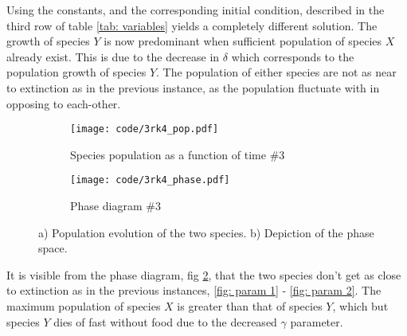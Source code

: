 \documentclass[a4paper]{article}
\newcommand{\newparagraph}{\vspace{.5cm}\noindent}
\begin{document}
\newparagraph
Using the constants, and the corresponding initial condition, described in the third row of table \ref{tab: variables} yields a completely different solution. The growth of species $Y$ is now predominant when sufficient population of species $X$ already exist. This is due to the decrease in $\delta$ which corresponds to the population growth of species $Y$. The population of either species are not as near to extinction as in the previous instance, as the population fluctuate with in opposing to each-other.
\begin{figure}[H]
    \centering
    \begin{subfigure}{0.45\textwidth}
        \texttt{[image: code/3rk4\_pop.pdf]}
        \caption{Species population as a function of time $\#3$}
        \label{fig: param 3 pop}
    \end{subfigure}
    \hfill    
    \begin{subfigure}{0.45\textwidth}
        \texttt{[image: code/3rk4\_phase.pdf]}
        \caption{Phase diagram $\#3$}
        \label{fig: param 3 phase}
    \end{subfigure}
    \caption{a) Population evolution of the two species. b) Depiction of the phase space.}
    \label{fig: param 3}
\end{figure}\noindent
It is visible from the phase diagram, fig \ref{fig: param 3 phase}, that the two species don't get as close to extinction as in the previous instances, \ref{fig: param 1} - \ref{fig: param 2}. The maximum population of species $X$ is greater than that of species $Y$, which but species $Y$ dies of fast without food due to the decreased $\gamma$ parameter. 
\end{document}
